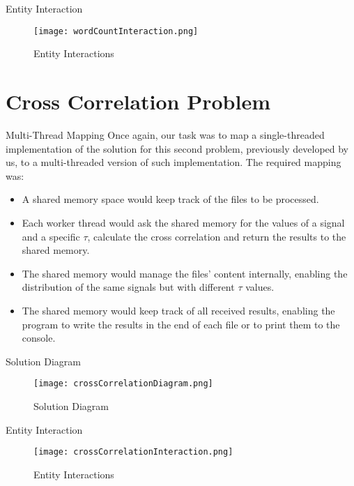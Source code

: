 \documentclass{beamer}
\begin{document}
\begin{frame}{Entity Interaction}
	\begin{figure}
		\texttt{[image: wordCountInteraction.png]}
		\caption{Entity Interactions}
		\label{wordInteraction}
	\end{figure}
\end{frame}


\section{Cross Correlation Problem}


\begin{frame}{Multi-Thread Mapping}
	Once again, our task was to map a single-threaded implementation of the solution for this second problem, previously developed by us, to a multi-threaded
	version of such implementation.
	The required mapping was:
	\begin{itemize}
		\item A shared memory space would keep track of the files to be processed.
		\item Each worker thread would ask the shared memory for the values of a signal and a specific $\tau$, calculate the cross correlation and return the results to the shared memory.
		\item The shared memory would manage the files' content internally, enabling the distribution of the same signals but with different $\tau$ values.
		\item The shared memory would keep track of all received results, enabling the program to write the results in the end of each file or to print them to the console.
	\end{itemize}
\end{frame}


\begin{frame}{Solution Diagram}
	\begin{figure}
		\texttt{[image: crossCorrelationDiagram.png]}
		\caption{Solution Diagram}
		\label{crossDiagram}
	\end{figure}
\end{frame}


\begin{frame}{Entity Interaction}
	\begin{figure}
		\texttt{[image: crossCorrelationInteraction.png]}
		\caption{Entity Interactions}
		\label{crossInteraction}
	\end{figure}
\end{frame}
\end{document}
